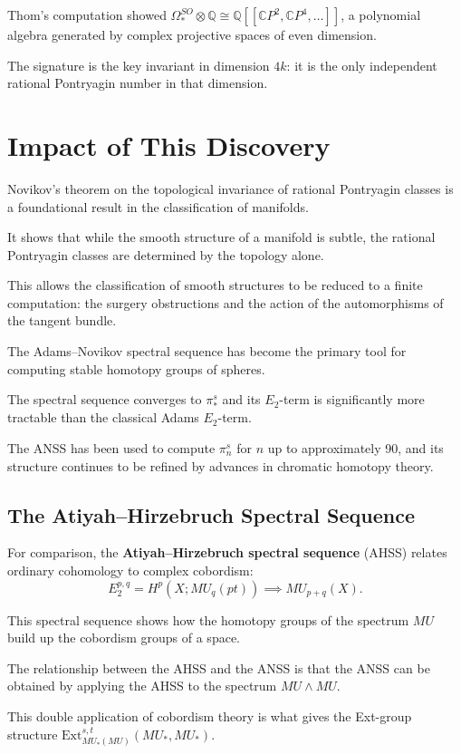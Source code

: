 Thom's computation showed $\Omega_*^{SO} \otimes \mathbb{Q} \cong \mathbb{Q}[[\mathbb{C}P^2, \mathbb{C}P^4, \ldots]]$, a polynomial algebra generated by complex projective spaces of even dimension.

The signature is the key invariant in dimension $4k$: it is the only independent rational Pontryagin number in that dimension.

\section{Impact of This Discovery}

Novikov's theorem on the topological invariance of rational Pontryagin classes is a foundational result in the classification of manifolds.

It shows that while the smooth structure of a manifold is subtle, the rational Pontryagin classes are determined by the topology alone.

This allows the classification of smooth structures to be reduced to a finite computation: the surgery obstructions and the action of the automorphisms of the tangent bundle.

The Adams--Novikov spectral sequence has become the primary tool for computing stable homotopy groups of spheres.

The spectral sequence converges to $\pi_*^s$ and its $E_2$-term is significantly more tractable than the classical Adams $E_2$-term.

The ANSS has been used to compute $\pi_n^s$ for $n$ up to approximately 90, and its structure continues to be refined by advances in chromatic homotopy theory.

\subsection*{The Atiyah--Hirzebruch Spectral Sequence}

For comparison, the \textbf{Atiyah--Hirzebruch spectral sequence} (AHSS) relates ordinary cohomology to complex cobordism:
\[
E_2^{p,q} = H^p(X; MU_q(pt)) \implies MU_{p+q}(X).
\]

This spectral sequence shows how the homotopy groups of the spectrum $MU$ build up the cobordism groups of a space.

The relationship between the AHSS and the ANSS is that the ANSS can be obtained by applying the AHSS to the spectrum $MU \wedge MU$.

This double application of cobordism theory is what gives the Ext-group structure $\text{Ext}_{MU_*(MU)}^{s,t}(MU_*, MU_*)$.

